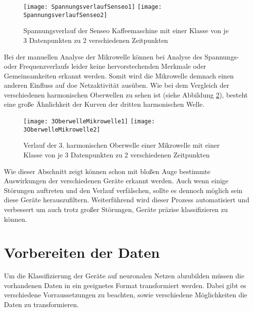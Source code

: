     \begin{figure}[H]
        \centering
        \texttt{[image: SpannungsverlaufSenseo1]}
        \texttt{[image: SpannungsverlaufSenseo2]}
        \caption{Spannungsverlauf der Senseo Kaffeemaschine mit einer Klasse von je 3 Datenpunkten zu 2 verschiedenen Zeitpunkten}
        \label{fig:SpannungsverlaufSenseo}
    \end{figure}

    \noindent
    Bei der manuellen Analyse der Mikrowelle können bei Analyse des Spannungs- oder Frequenzverlaufs leider keine hervorstechenden Merkmale oder Gemeinsamkeiten erkannt werden.
    Somit wird die Mikrowelle demnach einen anderen Einfluss auf doe Netzaktivität ausüben.
    Wie bei dem Vergleich der verschiedenen harmonischen Oberwellen zu sehen ist (siehe Abbildung \ref{fig:3OberwelleMikrowelle}), besteht eine große Ähnlichkeit der Kurven der dritten harmonischen Welle.\\
    \newline

    \begin{figure}[H]
        \centering
        \texttt{[image: 3OberwelleMikrowelle1]}
        \texttt{[image: 3OberwelleMikrowelle2]}
        \caption{Verlauf der 3. harmonischen Oberwelle einer Mikrowelle mit einer Klasse von je 3 Datenpunkten zu 2 verschiedenen Zeitpunkten}
        \label{fig:3OberwelleMikrowelle}
    \end{figure}

    \noindent
    Wie dieser Abschnitt zeigt können schon mit bloßen Auge bestimmte Auswirkungen der verschiedenen Geräte erkannt werden.
    Auch wenn einige Störungen auftreten und den Verlauf verfälschen, sollte es dennoch möglich sein diese Geräte herauszufiltern.
    Weiterführend wird dieser Prozess automatisiert und verbessert um auch trotz großer Störungen, Geräte präzise klassifizieren zu können. 

\section{Vorbereiten der Daten}\label{VorbereitenDerDaten}
    Um die Klassifizierung der Geräte auf neuronalen Netzen abzubilden müssen die vorhandenen Daten in ein geeignetes Format transformiert werden.
    Dabei gibt es verschiedene Vorraussetzungen zu beachten, sowie verschiedene Möglichkeiten die Daten zu transformieren.\\
    
